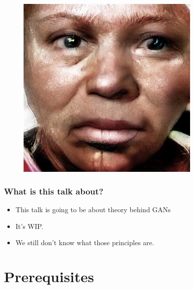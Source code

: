 \documentclass{beamer}
\begin{document}
\begin{frame}
\begin{figure}[h!]
	\centering
	\includegraphics[width=0.8\textwidth]{4k_black_woman.jpg}
\end{figure}
\end{frame}
\begin{frame}
\frametitle{What is this talk about?}
\begin{itemize}
	\item This talk is going to be about theory behind GANs
	\item It's WIP.
	\item We still don't know what those principles are.
\end{itemize}

\end{frame}

\section{Prerequisites}
\end{document}
